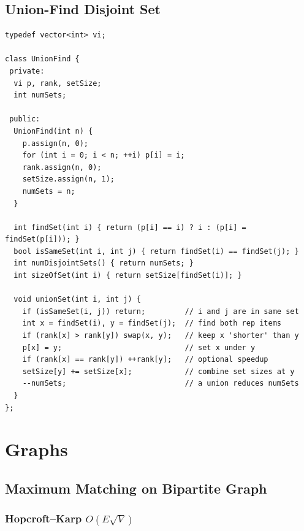 \documentclass[10pt]{article}
\begin{document}
\subsection{Union-Find Disjoint Set}

\begin{lstlisting}
typedef vector<int> vi;

class UnionFind {
 private:
  vi p, rank, setSize;
  int numSets;

 public:
  UnionFind(int n) {
    p.assign(n, 0);
    for (int i = 0; i < n; ++i) p[i] = i;
    rank.assign(n, 0);
    setSize.assign(n, 1);
    numSets = n;
  }

  int findSet(int i) { return (p[i] == i) ? i : (p[i] = findSet(p[i])); }
  bool isSameSet(int i, int j) { return findSet(i) == findSet(j); }
  int numDisjointSets() { return numSets; }
  int sizeOfSet(int i) { return setSize[findSet(i)]; }

  void unionSet(int i, int j) {
    if (isSameSet(i, j)) return;         // i and j are in same set
    int x = findSet(i), y = findSet(j);  // find both rep items
    if (rank[x] > rank[y]) swap(x, y);   // keep x 'shorter' than y
    p[x] = y;                            // set x under y
    if (rank[x] == rank[y]) ++rank[y];   // optional speedup
    setSize[y] += setSize[x];            // combine set sizes at y
    --numSets;                           // a union reduces numSets
  }
};
\end{lstlisting}

\section{Graphs}

\subsection{Maximum Matching on Bipartite Graph}

\subsubsection{Hopcroft–Karp $O(E \sqrt{V})$}
\end{document}
